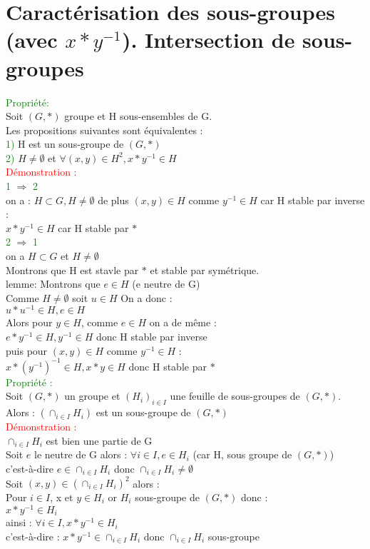 \documentclass{article}
\begin{document}
\section{Caractérisation des sous-groupes (avec $x \ast y^{-1}$). Intersection de sous-groupes}
\textcolor{green}{Propriété:} \\ 
Soit $(G, \ast)$ groupe et H sous-ensembles de G. \\
Les propositions suivantes sont équivalentes : \\ 
\textcolor{green}{1)} H est un sous-groupe de $(G, \ast)$ \\ 
\textcolor{green}{2)} $H \neq \emptyset$ et $ \forall (x,y) \in H^2, x \ast y^{-1} \in H$ \\ 
\textcolor{red}{Démonstration :} \\ 
\textcolor{green}{1} $ \Rightarrow$ \textcolor{green}{2} \\ 
on a : $H \subset G, H \neq \emptyset$ de plus $(x,y) \in H$  comme $y^{-1} \in H$ car H stable par inverse :\\
$x \ast y^{-1} \in H$ car H stable par $\ast$  \\ 
\textcolor{green}{2} $\Rightarrow$ \textcolor{green}{1} \\ 
on a $H \subset G$ et $ H \neq \emptyset$ \\ 
Montrons que H est stavle par $\ast$ et stable par symétrique. \\ 
lemme: Montrons que $e \in H$ (e neutre de G) \\ 
Comme $H \neq \emptyset$ soit $ u \in H$ On a donc : \\ 
$u \ast u^{-1} \in H, e \in H$ \\ 
Alors pour $y \in H$, comme $e \in H$ on a de même : \\ 
$e \ast y^{-1} \in H, y^{-1}\in H$  donc H stable  par inverse\\ 
puis pour $(x,y)\in H$ comme $y^{-1} \in H$ : \\ 
$x \ast (y^{-1})^{-1}\in H, x \ast y \in H$ donc H stable par $\ast$ \\ 
\textcolor{green}{Propriété :}\\ 
Soit $(G,\ast)$ un groupe et $(H_i)_{i\in I}$ une feuille de sous-groupes de $(G, \ast)$. \\ 
Alors : $(\cap_{i\in I}H_i)$ est un sous-groupe de $(G, \ast)$ \\ 
\textcolor{red}{Démonstration :} \\ 
$\cap_{i\in I}H_i$ est bien une partie de G \\ 
Soit $e$ le neutre de G alors : $ \forall i \in I, e \in H_i$ (car H, sous groupe de $(G,\ast)$) \\ 
c'est-à-dire $ e\in \cap_{i\in I}H_i$ donc $\cap_{i\in I}H_i \neq \emptyset$ \\ 
Soit $(x,y) \in (\cap_{i\in I}H_i)^2$ alors : \\ 
Pour $i \in I$, x et $y \in H_i$ or $H_i$ sous-groupe de $(G, \ast)$ donc : \\ 
$x \ast y^{-1} \in H_i$ \\ 
ainsi : $\forall i \in I,x \ast y^{-1} \in H_i$ \\ 
c'est-à-dire : $x \ast y^{-1} \in \cap_{i\in I}H_i$ donc $\cap_{i\in I}H_i$ sous-groupe
\end{document}
